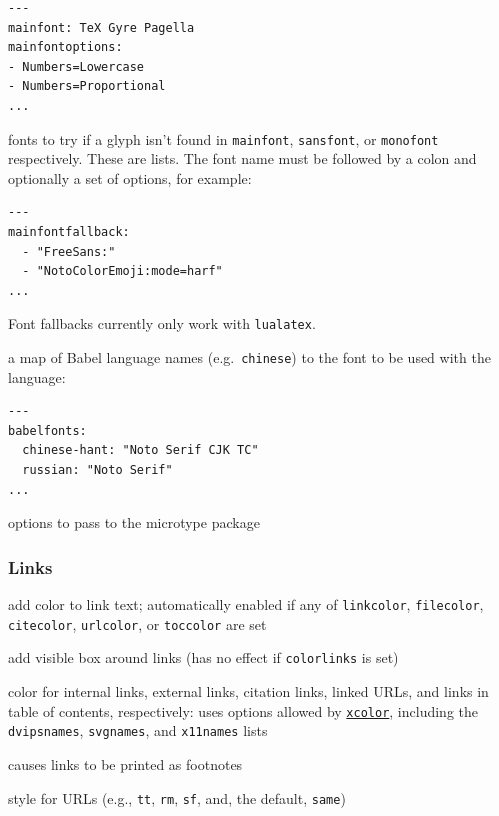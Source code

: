 \documentclass[
  b5paper
]{book}
\providecommand{\tightlist}{%
  \setlength{\itemsep}{0pt}\setlength{\parskip}{0pt}}
\begin{document}
\begin{description}
\begin{verbatim}
---
mainfont: TeX Gyre Pagella
mainfontoptions:
- Numbers=Lowercase
- Numbers=Proportional
...
\end{verbatim}
\item[\texttt{mainfontfallback}, \texttt{sansfontfallback},
\texttt{monofontfallback}]
fonts to try if a glyph isn't found in \texttt{mainfont},
\texttt{sansfont}, or \texttt{monofont} respectively. These are lists.
The font name must be followed by a colon and optionally a set of
options, for example:

\begin{verbatim}
---
mainfontfallback:
  - "FreeSans:"
  - "NotoColorEmoji:mode=harf"
...
\end{verbatim}

Font fallbacks currently only work with \texttt{lualatex}.
\item[\texttt{babelfonts}]
a map of Babel language names (e.g.~\texttt{chinese}) to the font to be
used with the language:

\begin{verbatim}
---
babelfonts:
  chinese-hant: "Noto Serif CJK TC"
  russian: "Noto Serif"
...
\end{verbatim}
\item[\texttt{microtypeoptions}]
options to pass to the microtype package
\end{description}

\subsubsection{Links}\label{links}

\begin{description}
\tightlist
\item[\texttt{colorlinks}]
add color to link text; automatically enabled if any of
\texttt{linkcolor}, \texttt{filecolor}, \texttt{citecolor},
\texttt{urlcolor}, or \texttt{toccolor} are set
\item[\texttt{boxlinks}]
add visible box around links (has no effect if \texttt{colorlinks} is
set)
\item[\texttt{linkcolor}, \texttt{filecolor}, \texttt{citecolor},
\texttt{urlcolor}, \texttt{toccolor}]
color for internal links, external links, citation links, linked URLs,
and links in table of contents, respectively: uses options allowed by
\href{https://ctan.org/pkg/xcolor}{\texttt{xcolor}}, including the
\texttt{dvipsnames}, \texttt{svgnames}, and \texttt{x11names} lists
\item[\texttt{links-as-notes}]
causes links to be printed as footnotes
\item[\texttt{urlstyle}]
style for URLs (e.g., \texttt{tt}, \texttt{rm}, \texttt{sf}, and, the
default, \texttt{same})
\end{description}
\end{document}
